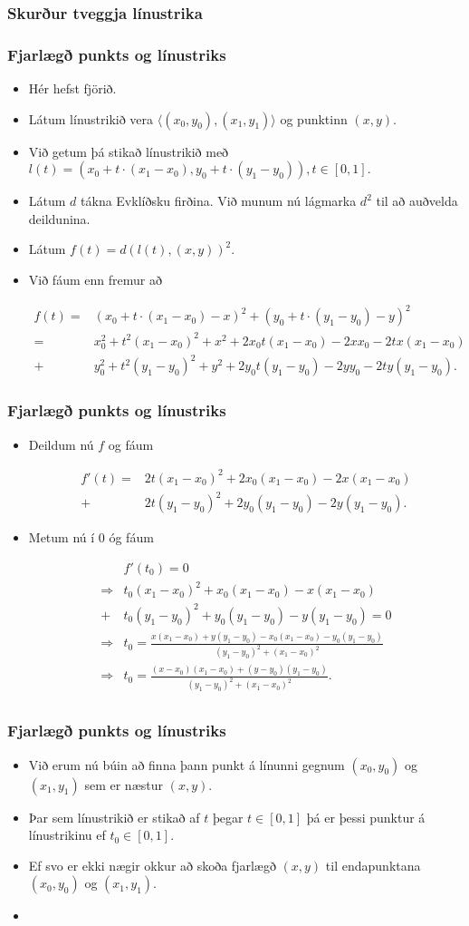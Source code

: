 \documentclass{beamer}
\newcommand\env[2]
{
	\begin{#1}
	#2
	\end{#1}
}
\newcommand\code[1]{\tiny}
\begin{document}
\env{frame}
{
	\frametitle{Skurður tveggja línustrika}
	\code{lxl.h}
}

\env{frame}
{
	\frametitle{Fjarlægð punkts og línustriks}
	\env{itemize}
	{
		\item<1-> Hér hefst fjörið. 
		\item<2-> Látum línustrikið vera $\langle (x_0, y_0), (x_1, y_1) \rangle$ og punktinn $(x, y)$.
		\item<3-> Við getum þá stikað línustrikið með $l(t) = (x_0 + t\cdot(x_1 - x_0), y_0 + t\cdot(y_1 - y_0)), t \in [0, 1].$
		\item<4-> Látum $d$ tákna Evklíðsku firðina. Við munum nú lágmarka $d^2$ til að auðvelda deildunina.
		\item<5-> Látum $f(t) = d(l(t), (x, y))^2$.
		\item<6-> Við fáum enn fremur að
		\env{align*}
		{
			f(t)
			=& (x_0 + t\cdot(x_1 - x_0) - x)^2 + (y_0 + t\cdot(y_1 - y_0) - y)^2\\
			=& x_0^2 + t^2(x_1 - x_0)^2 + x^2 + 2x_0t(x_1 - x_0) - 2xx_0 - 2tx(x_1 - x_0)\\
			+& y_0^2 + t^2(y_1 - y_0)^2 + y^2 + 2y_0t(y_1 - y_0) - 2yy_0 - 2ty(y_1 - y_0).
		}
	}
}

\env{frame}
{
	\frametitle{Fjarlægð punkts og línustriks}
	\env{itemize}
	{
		\item<1-> Deildum nú $f$ og fáum 
		\env{align*}
		{
			f'(t)
			=& 2t(x_1 - x_0)^2 + 2x_0(x_1 - x_0) - 2x(x_1 - x_0)\\
			+& 2t(y_1 - y_0)^2 + 2y_0(y_1 - y_0) - 2y(y_1 - y_0).
		}
		\item<2-> Metum nú í $0$ óg fáum
		\env{align*}
		{
			& f'(t_0) = 0\\
			\Rightarrow & t_0(x_1 - x_0)^2 + x_0(x_1 - x_0) - x(x_1 - x_0)\\
			+& t_0(y_1 - y_0)^2 + y_0(y_1 - y_0) - y(y_1 - y_0) = 0\\
			\Rightarrow & t_0 = \frac{x(x_1 - x_0) + y(y_1 - y_0) - x_0(x_1 - x_0) - y_0(y_1 - y_0)}{(y_1 - y_0)^2 + (x_1 - x_0)^2}\\
			\Rightarrow & t_0 = \frac{(x - x_0)(x_1 - x_0) + (y - y_0)(y_1 - y_0)}{(y_1 - y_0)^2 + (x_1 - x_0)^2}.\\
		}
	}
}

\env{frame}
{
	\frametitle{Fjarlægð punkts og línustriks}
	\env{itemize}
	{
		\item<1-> Við erum nú búin að finna þann punkt á línunni gegnum $(x_0, y_0)$ og $(x_1, y_1)$ sem er
			næstur $(x, y)$. 
		\item<2-> Þar sem línustrikið er stikað af $t$ þegar $t \in [0, 1]$ þá er þessi punktur
			á línustrikinu ef $t_0 \in [0, 1]$.
		\item<3-> Ef svo er ekki nægir okkur að skoða fjarlægð $(x, y)$ til endapunktana $(x_0, y_0)$ og $(x_1, y_1)$.
		\item<4-> \code{p2l.h}
	}
}
\end{document}
